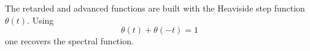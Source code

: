 \documentclass{article}
\begin{document}
The retarded and advanced functions are built with the Heaviside step function $\theta(t)$.
Using
\begin{equation}
\theta(t) + \theta(-t) = 1
\label{eq:step}
\end{equation}
one recovers the spectral function.
\end{document}
